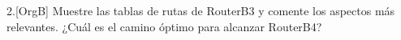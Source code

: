 \begin{ejer}
2.[OrgB] Muestre las tablas de rutas de RouterB3 y comente los aspectos más
relevantes. ¿Cuál es el camino óptimo para alcanzar RouterB4?
\end{ejer}